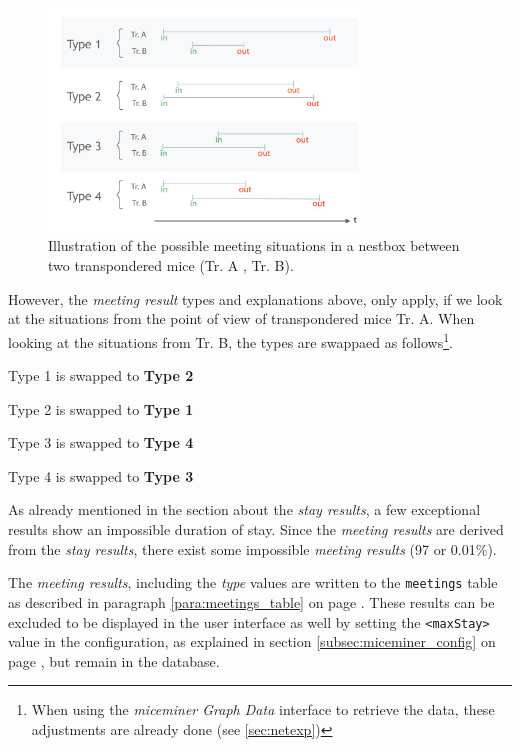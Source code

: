 \begin{figure}[htpb]
\begin{center}
  \includegraphics[width=0.75\textwidth]{assets/pdf/meeting_types_schema.pdf}
  \caption[Meeting resulst types illusttration]{Illustration of the possible meeting situations in a nestbox between two transpondered mice (Tr. A , Tr. B).}
  \label{fig:meeting_types}
\end{center}
\end{figure}

However, the \textit{meeting result} types and explanations above, only apply, if we look at the situations from the point of view of transpondered mice Tr. A. When looking at the situations from Tr. B, the types are swappaed as follows\footnote{When using the \textit{miceminer Graph Data} interface to retrieve the data, these adjustments are already done (see \ref{sec:netexp})}.

\begin{mylist}
\item Type 1 is swapped to \textbf{Type 2}   
\item Type 2 is swapped to \textbf{Type 1}
\item Type 3 is swapped to \textbf{Type 4} 
\item Type 4 is swapped to \textbf{Type 3}
\end{mylist}

As already mentioned in the section about the \textit{stay results}, a few exceptional results show an impossible duration of stay. Since the \textit{meeting results} are derived from the \textit{stay results}, there exist some impossible \textit{meeting results} (97 or 0.01\%).  

The \textit{meeting results}, including the \textit{type} values are written to the \lstinline|meetings| table as described in paragraph \ref{para:meetings_table} on page \pageref{para:meetings_table}. These results can be excluded to be displayed in the user interface as well by setting the \lstinline|<maxStay>| value in the configuration, as explained in section \ref{subsec:miceminer_config} on page \pageref{subsec:miceminer_config}, but remain in the database.
